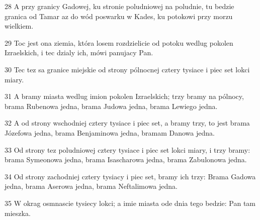 \par 28 A przy granicy Gadowej, ku stronie poludniowej na poludnie, tu bedzie granica od Tamar az do wód poswarku w Kades, ku potokowi przy morzu wielkiem.
\par 29 Toc jest ona ziemia, która losem rozdzielicie od potoku wedlug pokolen Izraelskich, i tec dzialy ich, mówi panujacy Pan.
\par 30 Tec tez sa granice miejskie od strony pólnocnej cztery tysiace i piec set lokci miary.
\par 31 A bramy miasta wedlug imion pokolen Izraelskich; trzy bramy na pólnocy, brama Rubenowa jedna, brama Judowa jedna, brama Lewiego jedna.
\par 32 A od strony wschodniej cztery tysiace i piec set, a bramy trzy, to jest brama Józefowa jedna, brama Benjaminowa jedna, bramam Danowa jedna.
\par 33 Od strony tez poludniowej cztery tysiace i piec set lokci miary, i trzy bramy: brama Symeonowa jedna, brama Isascharowa jedna, brama Zabulonowa jedna.
\par 34 Od strony zachodniej cztery tysiacy i piec set, bramy ich trzy: Brama Gadowa jedna, brama Aserowa jedna, brama Neftalimowa jedna.
\par 35 W okrag osmnascie tysiecy lokci; a imie miasta ode dnia tego bedzie: Pan tam mieszka.


